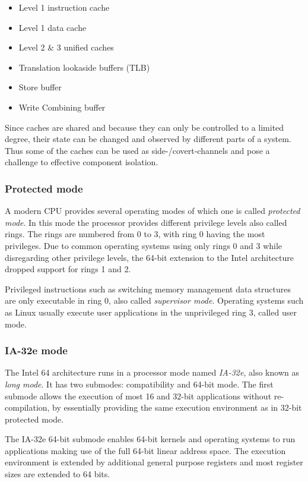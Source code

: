 \begin{itemize}
	\item Level 1 instruction cache
	\item Level 1 data cache
	\item Level 2 \& 3 unified caches
	\item Translation lookaside buffers (TLB)
	\item Store buffer
	\item Write Combining buffer
\end{itemize}

Since caches are shared and because they can only be controlled to a limited
degree, their state can be changed and observed by different parts of a system.
Thus some of the caches can be used as side-/covert-channels and pose a
challenge to effective component isolation.

\subsubsection{Protected mode}
A modern CPU provides several operating modes of which one is called
\emph{protected mode}. In this mode the processor provides different privilege
levels also called rings. The rings are numbered from 0 to 3, with ring 0 having
the most privileges. Due to common operating systems using only rings 0 and 3
while disregarding other privilege levels, the 64-bit extension to the Intel
architecture dropped support for rings 1 and 2.

Privileged instructions such as switching memory management data structures are
only executable in ring 0, also called \emph{supervisor mode}. Operating systems
such as Linux usually execute user applications in the unprivileged ring 3,
called user mode.

\subsubsection{IA-32e mode}
The Intel 64 architecture runs in a processor mode named \emph{IA-32e}, also
known as \emph{long mode}. It has two submodes: compatibility and 64-bit mode.
The first submode allows the execution of most 16 and 32-bit applications
without re-compilation, by essentially providing the same execution environment
as in 32-bit protected mode.

The IA-32e 64-bit submode enables 64-bit kernels and operating systems to run
applications making use of the full 64-bit linear address space. The execution
environment is extended by additional general purpose registers and most
register sizes are extended to 64 bits.

